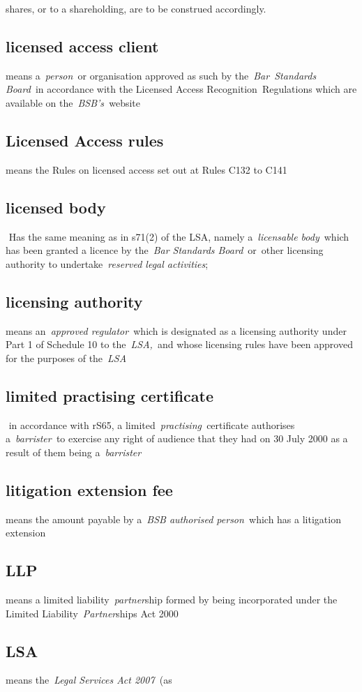   shares, or to a shareholding, are to be construed accordingly.\ln
   \subsection{licensed access client } means a~\emph{person~}or
  organisation approved as such by the~\emph{Bar~Standards Board~}in
  accordance with the Licensed Access Recognition~Regulations which are
  available on the~\emph{BSB's~}website  \subsection{Licensed Access rules } means the Rules on licensed access
  set out at Rules C132 to C141  \subsection{licensed body } Has the same meaning as in s71(2) of the LSA,
  namely a~\emph{licensable body}~which has been granted a licence by
  the~\emph{Bar Standards Board}~or~other licensing authority to
  undertake~\emph{reserved legal activities};  \subsection{licensing authority } means an~\emph{approved
  regulator~}which is designated as a licensing authority under Part 1
  of Schedule 10 to the~\emph{LSA,~}and whose licensing rules have been
  approved for the purposes of the~\emph{LSA} \subsection{limited practising certificate } in accordance with rS65, a
  limited~\emph{practising~}certificate authorises a~\emph{barrister~}to
  exercise any right of audience that they had on 30 July 2000 as a
  result of them being a~\emph{barrister} \subsection{litigation extension fee } means the amount payable by
  a~\emph{BSB authorised person~}which has a litigation extension  \subsection{LLP } means a limited liability~\emph{partner}ship formed by
  being incorporated under the Limited Liability~\emph{Partner}ships Act
  2000  \subsection{LSA } means the~\emph{Legal Services Act 2007~}(as
